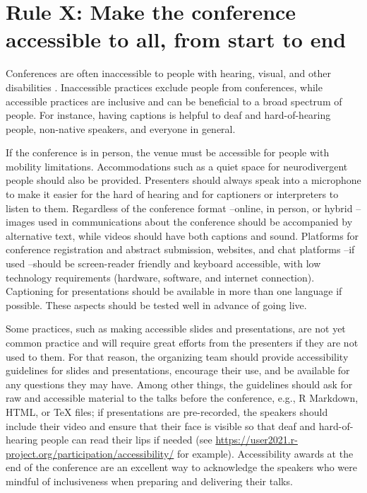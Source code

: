 \documentclass[10pt,letterpaper]{article}
\begin{document}
\section{Rule X: Make the conference accessible to all, from start to end}
\label{rule_accessibility}
Conferences are often inaccessible to people with hearing, visual, and other disabilities \cite{priceAccessImaginedConstruction2009}. %
Inaccessible practices exclude people from conferences, while accessible practices are inclusive and can be beneficial to a broad spectrum of people. For instance, having captions is helpful to deaf and hard-of-hearing people, non-native speakers, and everyone in general. 

If the conference is in person, the venue must be accessible for people with mobility limitations. 
Accommodations such as a quiet space for neurodivergent people should also be provided.
Presenters should always speak into a microphone to make it easier for the hard of hearing and for captioners or interpreters to listen to them. 
Regardless of the conference format --online, in person, or hybrid --images used in communications about the conference should be accompanied by alternative text, while videos should have both captions and sound. 
Platforms for conference registration and abstract submission, websites, and chat platforms --if used --should be screen-reader friendly and keyboard accessible, with low technology requirements (hardware, software, and internet connection). 
Captioning for presentations should be available in more than one language if possible.
These aspects should be tested well in advance of going live.  

Some practices, such as making accessible slides and presentations, are not yet common practice and will require great efforts from the presenters if they are not used to them. 
For that reason, the organizing team should provide accessibility guidelines for slides and presentations, encourage their use, and be available for any questions they may have.  
Among other things, the guidelines should ask for raw and accessible material to the talks before the conference, e.g., R Markdown, HTML, or \TeX{} files; if presentations are pre-recorded, the speakers should include their video and ensure that their face is visible so that deaf and hard-of-hearing people can read their lips if needed (see \url{https://user2021.r-project.org/participation/accessibility/} for example). 
Accessibility awards at the end of the conference are an excellent way to acknowledge the speakers who were mindful of inclusiveness when preparing and delivering their talks. 
\end{document}
